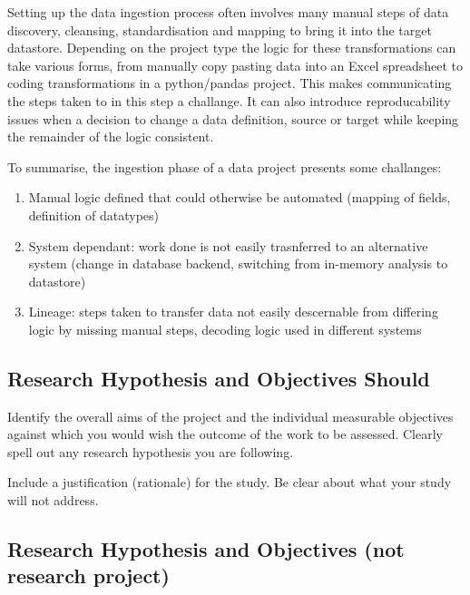 

Setting up the data ingestion process often involves many manual steps
of data discovery, cleansing, standardisation and mapping to bring it
into the target datastore. Depending on the project type the logic for
these transformations can take various forms, from manually copy pasting
data into an Excel spreadsheet to coding transformations in a
python/pandas project. This makes communicating the steps taken to in
this step a challange. It can also introduce reproducability issues when
a decision to change a data definition, source or target while keeping
the remainder of the logic consistent.

To summarise, the ingestion phase of a data project presents some
challanges:

\begin{enumerate}
\def\labelenumi{\arabic{enumi}.}
\tightlist
\item
  Manual logic defined that could otherwise be automated (mapping of
  fields, definition of datatypes)
\item
  System dependant: work done is not easily trasnferred to an
  alternative system (change in database backend, switching from
  in-memory analysis to datastore)
\item
  Lineage: steps taken to transfer data not easily descernable from
  differing logic by missing manual steps, decoding logic used in
  different systems
\end{enumerate}

\subsection{Research Hypothesis and Objectives
Should}\label{research-hypothesis-and-objectives-should}

Identify the overall aims of the project and the individual measurable
objectives against which you would wish the outcome of the work to be
assessed. Clearly spell out any research hypothesis you are following.

Include a justification (rationale) for the study. Be clear about what
your study will not address.

\subsection{Research Hypothesis and Objectives (not research
project)}\label{research-hypothesis-and-objectives-not-research-project}

